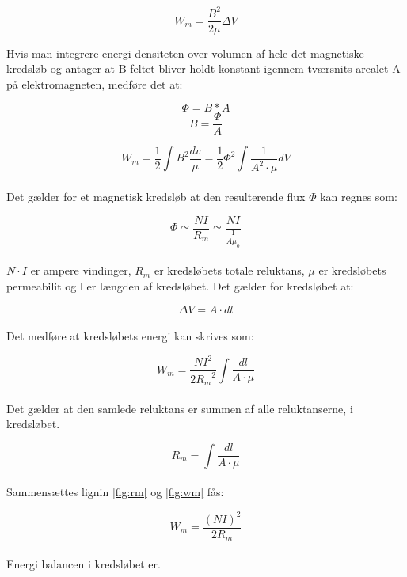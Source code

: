 \begin{equation}
W_m =\frac{B^2}{2 \mu} \Delta V
\end{equation}

Hvis man integrere energi densiteten over volumen af hele det magnetiske kredsløb og antager at B-feltet bliver holdt konstant igennem tværsnits arealet A på elektromagneten, medføre det at:

\begin{equation}
\Phi=B*A
\end{equation}
\begin{equation}
B=\frac{\Phi}{A}
\end{equation}

\begin{equation}
W_m = \frac{1}{2} \int B^2 \frac{dv}{\mu}  = \frac{1}{2} \Phi^2 \int \frac{1}{A^2 \cdot \mu} dV
\end{equation}
\\
Det gælder for et magnetisk kredsløb at den resulterende flux $\Phi$ kan regnes som:

\begin{equation}
\Phi \simeq \frac{NI}{R_m} \simeq  \frac{NI}{\frac{1}{A\mu_0}}
\end{equation}
\\
$N \cdot I$ er ampere vindinger, $R_m$ er kredsløbets totale reluktans, $ \mu $ er kredsløbets permeabilit og l er længden af kredsløbet. Det gælder for kredsløbet at:

\begin{equation}
\Delta V =A \cdot dl
\end{equation}
\\
Det medføre at kredsløbets energi kan skrives som:

\begin{equation}
W_m = \frac {NI^2} {2{R_m}^2} \int \frac{dl}{A \cdot \mu}
\label{fig:wm}
\end{equation}
\\
Det gælder at den samlede reluktans er summen af alle reluktanserne, i kredsløbet.

\begin{equation}
R_m = \int \frac{dl}{A \cdot \mu}
\label{fig:rm}
\end{equation}
\\
Sammensættes lignin \ref{fig:rm} og \ref{fig:wm} fås:

\begin{equation}
W_m = \frac{(NI)^2}{2R_m}
\label{wmdone}
\end{equation}
\\
Energi balancen i kredsløbet er.


